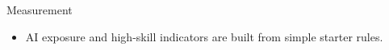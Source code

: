 \begin{frame}{Measurement}
\begin{itemize}
\item AI exposure and high-skill indicators are built from simple starter rules.
\end{itemize}
\end{frame}
